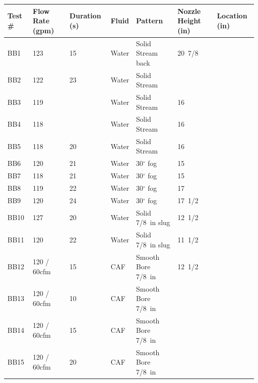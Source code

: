 \documentclass[12pt,oneside]{book}
\begin{document}
\begin{table}[!ht]
\footnotesize
\centering
{}\label{tab:spray_density_tests}
\begin{tabular}{lllllll}
\toprule[1.5pt]
Test \#    &   Flow Rate (gpm)  & Duration (s)  & Fluid  &  Pattern            & Nozzle Height (in) & Location (in) \\
\midrule
BB1        &   123              & 15            & Water  &  Solid Stream back  & 20~7/8             &          \\
BB2        &   122              & 23            & Water  &  Solid Stream       &                    &          \\
BB3        &   119              &               & Water  &  Solid Stream       & 16                 &          \\
BB4        &   118              &               & Water  &  Solid Stream       & 16                 &          \\
BB5        &   118              & 20            & Water  &  Solid Stream       & 16                 &          \\
BB6        &   120              & 21            & Water  &  30$^{\circ}$ fog   & 15                 &          \\
BB7        &   118              & 21            & Water  &  30$^{\circ}$ fog   & 15                 &          \\
BB8        &   119              & 22            & Water  &  30$^{\circ}$ fog   & 17                 &          \\
BB9        &   120              & 24            & Water  &  30$^{\circ}$ fog   & 17~1/2             &          \\
BB10       &   127              & 20            & Water  &  Solid 7/8~in slug  & 12~1/2             &          \\
BB11       &   120              & 22            & Water  &  Solid 7/8~in slug  & 11~1/2             &          \\
BB12       &   120 / 60cfm      & 15            & CAF    &  Smooth Bore 7/8~in & 12~1/2             &          \\
BB13       &   120 / 60cfm      & 10            & CAF    &  Smooth Bore 7/8~in &                    &          \\
BB14       &   120 / 60cfm      & 15            & CAF    &  Smooth Bore 7/8~in &                    &          \\
BB15       &   120 / 60cfm      & 20            & CAF    &  Smooth Bore 7/8~in &                    &          \\

\end{tabular}
\end{table}
\end{document}
